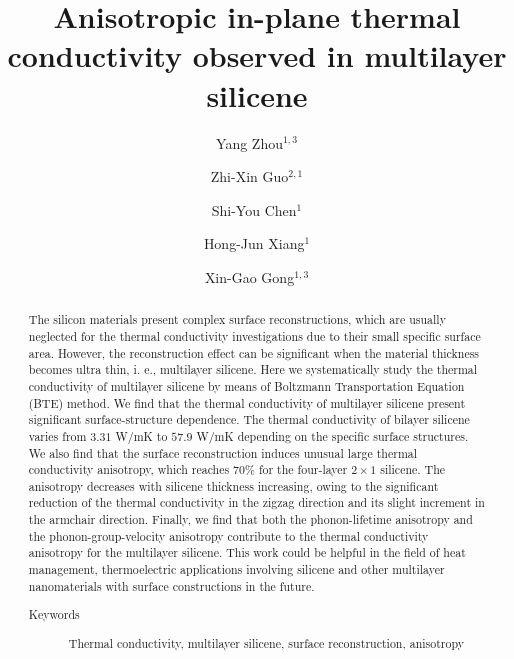\documentclass[aps,prb,twocolumn,showpacs,amsmath,amssymb]{revtex4-1}
\begin{document}
\title{Anisotropic in-plane thermal conductivity observed in multilayer silicene}
\author{Yang Zhou${}^{1,3}$}
\author{Zhi-Xin Guo${}^{2,1}$}
\author{Shi-You Chen${}^{1}$}
\author{Hong-Jun Xiang${}^{1}$}
\author{Xin-Gao Gong${}^{1,3}$}
\begin{abstract}
  The silicon materials present complex surface reconstructions, which are usually neglected for the thermal conductivity investigations due to their small specific surface area. However, the reconstruction effect can be significant when the material thickness becomes ultra thin, i. e., multilayer silicene. Here we systematically study the thermal conductivity of multilayer silicene by means of Boltzmann Transportation Equation (BTE) method.  We find that the thermal conductivity of multilayer silicene present significant surface-structure dependence. The thermal conductivity of bilayer silicene varies from $3.31$ W/mK to $57.9$ W/mK depending on the specific surface structures. We also find that the surface reconstruction induces unusual large thermal conductivity anisotropy, which reaches 70\%  for the four-layer  $2\times1$ silicene.  The anisotropy decreases with silicene thickness increasing, owing to the significant reduction of the thermal conductivity in the zigzag direction and its slight increment  in the armchair direction.
  Finally, we find that both the phonon-lifetime  anisotropy and the phonon-group-velocity  anisotropy contribute to the thermal conductivity anisotropy for the multilayer silicene.
  This work could be helpful in the field of heat management, thermoelectric applications involving silicene and other multilayer nanomaterials  with surface constructions in the future.

  \begin{description}
    \item[Keywords]
          Thermal conductivity, multilayer silicene, surface reconstruction, anisotropy
  \end{description}
\end{abstract}
\end{document}
